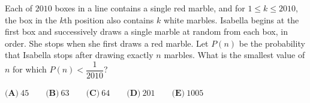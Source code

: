 Each of $2010$ boxes in a line contains a single red marble, and for $1\le k\le2010$, the box in the $k$th position also contains $k$ white marbles. Isabella begins at the first box and successively draws a single marble at random from each box, in order. She stops when she first draws a red marble. Let $P(n)$ be the probability that Isabella stops after drawing exactly $n$ marbles. What is the smallest value of $n$ for which $P(n)<\dfrac{1}{2010}$?

$\textbf{(A)}\ 45\qquad\textbf{(B)}\ 63\qquad\textbf{(C)}\ 64\qquad\textbf{(D)}\ 201\qquad\textbf{(E)}\ 1005$
